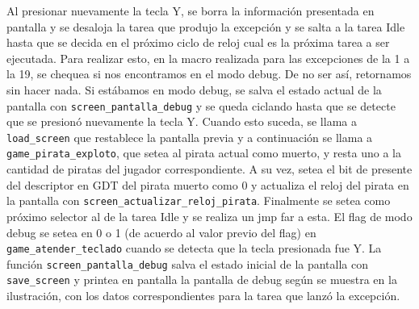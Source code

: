 Al presionar nuevamente la tecla Y, se borra la información presentada en pantalla y se desaloja la tarea que produjo la excepción y se salta a la tarea Idle hasta que se decida en el próximo ciclo de reloj cual es la próxima tarea a ser ejecutada.
Para realizar esto, en la macro realizada para las excepciones de la 1 a la 19, se chequea si nos encontramos en el modo debug. De no ser así, retornamos sin hacer nada. Si estábamos en modo debug, se salva el estado actual de la pantalla con \texttt{screen\_pantalla\_debug} y se queda ciclando hasta que se detecte que se presionó nuevamente la tecla Y. Cuando esto suceda, se llama a \texttt{load\_screen} que restablece la pantalla previa y a continuación se llama a \texttt{game\_pirata\_exploto}, que setea al pirata actual como muerto, y resta uno a la cantidad de piratas del jugador correspondiente. A su vez, setea el bit de presente del descriptor en GDT del pirata muerto como 0 y actualiza el reloj del pirata en la pantalla con \texttt{screen\_actualizar\_reloj\_pirata}. 
Finalmente se setea como próximo selector al de la tarea Idle y se realiza un jmp far a esta.
El flag de modo debug se setea en 0 o 1 (de acuerdo al valor previo del flag) en \texttt{game\_atender\_teclado} cuando se detecta que la tecla presionada fue Y.
La función \texttt{screen\_pantalla\_debug} salva el estado inicial de la pantalla con \texttt{save\_screen} y printea en pantalla la pantalla de debug según se muestra en la ilustración, con los datos correspondientes para la tarea que lanzó la excepción.

